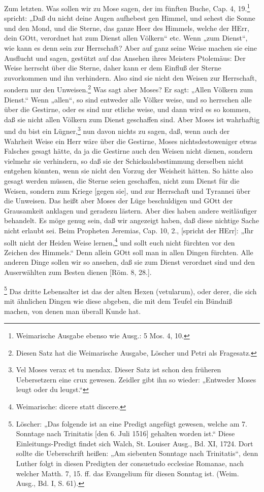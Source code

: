 Zum letzten. Was sollen wir zu Mose sagen, der im fünften Buche, Cap. 4, 19.\footnote{Weimarische Ausgabe ebenso wie Ausg.: 5 Mos. 4, 10.} spricht: „Daß du nicht deine Augen aufhebest gen Himmel, und sehest die Sonne und den Mond, und die Sterne, das ganze Heer des Himmels, welche der HErr, dein GOtt, verordnet hat zum Dienst allen Völkern“ etc. Wenn „zum Dienst“, wie kann es denn sein zur Herrschaft? Aber auf ganz seine Weise machen sie eine Ausflucht und sagen, gestützt auf das Ansehen ihres Meisters Ptolemäus: Der Weise herrscht über die Sterne, daher kann er dem Einfluß der Sterne zuvorkommen und ihn verhindern. Also sind sie nicht den Weisen zur Herrschaft, sondern nur den Unweisen.\footnote{Diesen Satz hat die Weimarische Ausgabe, Löscher und Petri als Fragesatz.} Was sagt aber Moses? Er sagt: „Allen Völkern zum Dienst.“ Wenn „allen“, so sind entweder alle Völker weise, und so herrschen alle über die Gestirne, oder es sind nur etliche weise, und dann wird es so kommen, daß
sie nicht allen Völkern zum Dienst geschaffen sind. Aber Moses ist wahrhaftig und du bist ein Lügner,\footnote{Vel Moses verax et tu mendax. Dieser Satz ist schon den früheren Uebersetzern eine crux gewesen. Zeidler gibt ihn so wieder: „Entweder Moses leugt oder du leugst.“} nun davon nichts zu sagen, daß, wenn auch der Wahrheit Weise ein Herr wäre über die Gestirne, Moses nichtsdestoweniger etwas Falsches gesagt hätte, da ja die Gestirne auch den Weisen nicht dienen, sondern vielmehr sie verhindern, so daß sie der Schicksalsbestimmung derselben nicht entgehen könnten, wenn sie nicht den Vorzug der Weisheit hätten. So hätte also gesagt werden müssen, die Sterne seien geschaffen, nicht zum Dienst für die Weisen, sondern zum Kriege [gegen sie], und zur Herrschaft und Tyrannei über die Unweisen. Das heißt aber Moses der Lüge beschuldigen und GOtt der Grausamkeit anklagen und geradezu lästern. Aber dies haben andere weitläufiger behandelt. Es möge genug sein, daß wir angezeigt haben, daß diese nichtige Sache nicht erlaubt sei. Beim Propheten Jeremias, Cap. 10, 2., [spricht der HErr]: „Ihr sollt nicht der Heiden Weise lernen,\footnote{Weimarische: dicere statt discere.} und sollt euch nicht fürchten vor den Zeichen des Himmels.“ Denn allein GOtt soll man in allen Dingen fürchten. Alle anderen Dinge sollen wir so ansehen, daß sie zum Dienst verordnet sind und den Auserwählten zum Besten dienen [Röm. 8, 28.].

\footnote{Löscher: „Das folgende ist an eine Predigt angefügt gewesen, welche am 7. Sonntage nach Trinitatis [den 6. Juli 1516] gehalten worden ist.“ Diese Einleitungs-Predigt findet sich Walch, St. Louiser Ausg., Bd. XI, 1724. Dort sollte die Ueberschrift heißen: „Am siebenten Sonntage nach Trinitatis“, denn Luther folgt in diesen Predigten der consuetudo ecclesiae Romanae, nach welcher Matth. 7, 15. ff. das Evangelium für diesen Sonntag ist. (Weim. Ausg., Bd. I, S. 61).} Das dritte Lebensalter ist das der alten Hexen (vetularum), oder derer, die sich mit ähnlichen Dingen wie diese abgeben, die mit dem Teufel ein Bündniß machen, von denen man überall Kunde hat.

